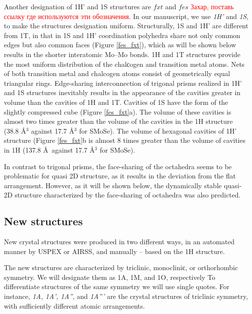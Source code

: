 \documentclass[a4paperm]{article}
\begin{document}
Another designation of 1H' and 1S structures are $fxt$ and $fes$ \cite{}\textcolor{red}{Захар, поставь ссылку где используются эти обозначения}.
In our manuscript, we use {\it 1H'} and {\it 1S}, to make the structures designation uniform.
Structurally, 1S and 1H' are different from 1T, in that in 1S and 1H' coordination polyhedra share not only common edges but also common faces (Figure \ref{fes_fxt}), which as will be shown below results in the shorter interatomic Mo--Mo bonds.
1H and 1T structures provide the most uniform distribution of the chalсogen and transition metal atoms.
Nets of both transition metal and chalcogen atoms consist of  geometrically equal triangular rings.
Edge-sharing interconnection of trigonal prisms realized in 1H' and 1S structures inevitably results in the appearance of the cavities greater in volume than the cavities of 1H and 1T. 
Cavities of 1S have the form of the slightly compressed cube (Figure \ref{fes_fxt}a).
The volume of these cavities is almost two times greater than the volume of the cavities in the 1H structure (38.8 \AA$^3$ against 17.7 \AA$^3$ for SMoSe).
The volume of hexagonal cavities of 1H' structure (Figure \ref{fes_fxt}b is almost 8 times greater than the volume of cavities in 1H (137.8 \AA\ against 17.7 \AA$^3$ for SMoSe).

In contrast to trigonal prisms, the face-sharing of the octahedra seems to be problematic for quasi 2D structure, as it results in the deviation from the flat arrangement.
However, as it will be shown below, the dynamically stable quasi-2D structure characterized by the face-sharing of octahedra was also predicted.



		\subsection{New structures}

New crystal structures were produced in two different ways, in an automated manner by USPEX or AIRSS, and manually -- based on the 1H structure.

The new structures are characterized by triclinic, monocliniс, or orthorhombic symmetry.
We will designate them as 1A, 1M, and 1O, respectively
To differentiate structures of the same symmetry we will use single quotes.
For instance, {\it 1A, 1A', 1A''}, and {\it 1A'''} are the crystal structures of triclinic symmetry, with sufficiently different atomic arrangements.
\end{document}
